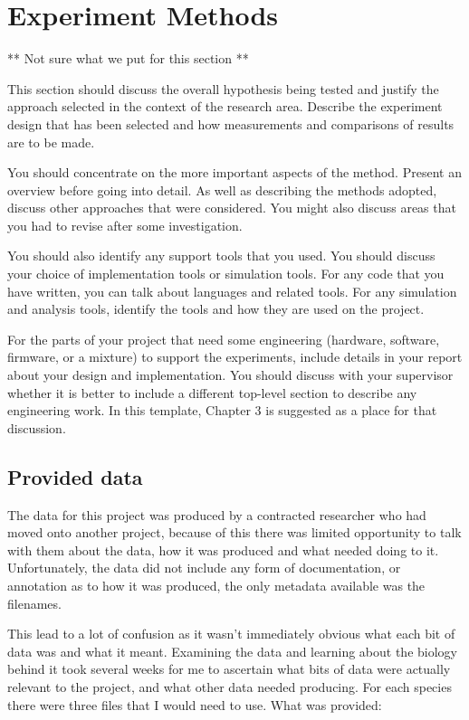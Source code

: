 \chapter{Experiment Methods}

** Not sure what we put for this section **

This section should discuss the overall hypothesis being tested and justify the approach selected in the context of the research area.  Describe the experiment design that has been selected and how measurements and comparisons of results are to be made. 

You should concentrate on the more important aspects of the method. Present an overview before going into detail. As well as describing the methods adopted, discuss other approaches that were considered. You might also discuss areas that you had to revise after some investigation. 

You should also identify any support tools that you used. You should discuss your choice of implementation tools or simulation tools. For any code that you have written, you can talk about languages and related tools. For any simulation and analysis tools, identify the tools and how they are used on the project. 

For the parts of your project that need some engineering (hardware, software, firmware, or a mixture) to support the experiments, include details in your report about your design and implementation. You should discuss with your supervisor whether it is better to include a different top-level section to describe any engineering work.  In this template, Chapter 3 is suggested as a place for that discussion.

\section{Provided data}
The data for this project was produced by a contracted researcher who had moved onto another project, because of this there was limited opportunity to talk with them about the data, how it was produced and what needed doing to it. Unfortunately, the data did not include any form of documentation, or annotation as to how it was produced, the only metadata available was the filenames. 

This lead to a lot of confusion as it wasn't immediately obvious what each bit of data was and what it meant. Examining the data and learning about the biology behind it took several weeks for me to ascertain what bits of data were actually relevant to the project, and what other data needed producing. For each species there were three files that I would need to use. What was provided:

